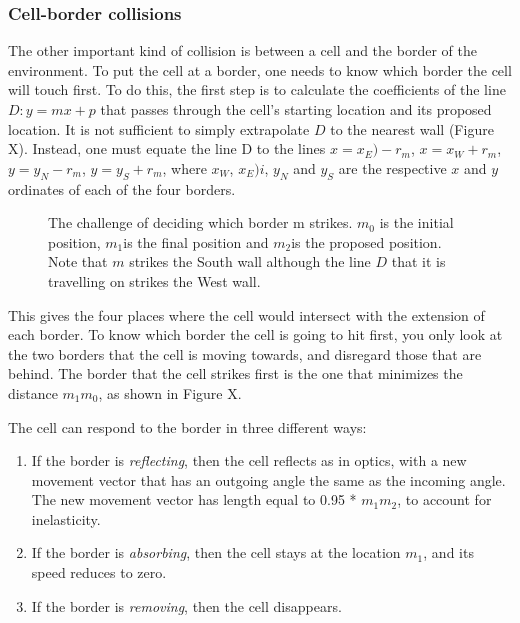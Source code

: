\documentclass[12pt]{article}
\begin{document}
\subsubsection{Cell-border collisions}
The other important kind of collision is between a cell and the border 
of the environment. To put the cell at a border, one needs to know which 
border the cell will touch first. To do this, the first step is to 
calculate the coefficients of the line \(D: y=mx + p\) that passes through 
the cell's starting location and its proposed location. It is not 
sufficient to simply extrapolate \(D\) to the nearest wall (Figure X). 
Instead, one must equate the line D to the lines 
\(x = x_E) - r_m\), \(x = x_W + r_m\), \(y = y_N - r_m\), \(y = y_S + r_m\), 
where \(x_W\), \(x_E)i\), \(y_N\) and \(y_S\) are the respective \(x\) 
and \(y\) ordinates of each of the four borders.

\begin{figure}[H]
\centering
\caption{The challenge of deciding which border m 
  strikes. \(m_0\) is the initial position, \(m_1\)is the final 
  position and \(m_2\)is the proposed position. Note that \(m\) strikes 
  the South wall although the line \(D\) that it is travelling on strikes the 
West wall.}
\end{figure}

This gives the four places where the cell would intersect with the 
extension of each border. To know which border the cell is going to hit 
first, you only look at the two borders that the cell is moving towards, 
and disregard those that are behind. The border that the cell strikes 
first is the one that minimizes the distance \(m_1m_0\), as 
shown in Figure X. 

The cell can respond to the border in three different ways: 

\begin{enumerate}
  \item If the border is {\itshape reflecting}, then the cell reflects as in optics, 
with a new movement vector that has an outgoing angle the same as the 
incoming angle. The new movement vector has length equal to 0.95 * \(m_1m_2\), 
to account for inelasticity.
\item If the border is {\itshape absorbing}, then the cell stays at the location \(m_1\), 
  and its speed reduces to zero.
\item If the border is {\itshape removing}, then the cell disappears.
\end{enumerate}
\end{document}
